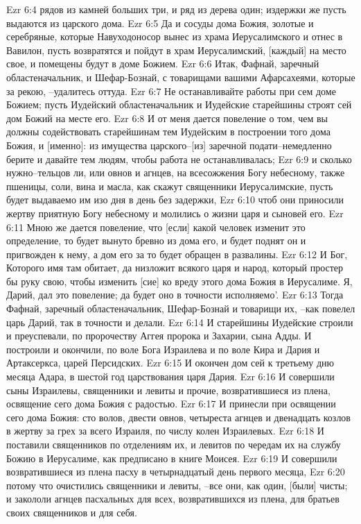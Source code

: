 Ezr 6:4  рядов из камней больших три, и ряд из дерева один; издержки же пусть выдаются из царского дома.
Ezr 6:5  Да и сосуды дома Божия, золотые и серебряные, которые Навуходоносор вынес из храма Иерусалимского и отнес в Вавилон, пусть возвратятся и пойдут в храм Иерусалимский, [каждый] на место свое, и помещены будут в доме Божием.
Ezr 6:6  Итак, Фафнай, заречный областеначальник, и Шефар-Бознай, с товарищами вашими Афарсахеями, которые за рекою, --удалитесь оттуда.
Ezr 6:7  Не останавливайте работы при сем доме Божием; пусть Иудейский областеначальник и Иудейские старейшины строят сей дом Божий на месте его.
Ezr 6:8  И от меня дается повеление о том, чем вы должны содействовать старейшинам тем Иудейским в построении того дома Божия, и [именно]: из имущества царского--[из] заречной подати--немедленно берите и давайте тем людям, чтобы работа не останавливалась;
Ezr 6:9  и сколько нужно--тельцов ли, или овнов и агнцев, на всесожжения Богу небесному, также пшеницы, соли, вина и масла, как скажут священники Иерусалимские, пусть будет выдаваемо им изо дня в день без задержки,
Ezr 6:10  чтоб они приносили жертву приятную Богу небесному и молились о жизни царя и сыновей его.
Ezr 6:11  Мною же дается повеление, что [если] какой человек изменит это определение, то будет вынуто бревно из дома его, и будет поднят он и пригвожден к нему, а дом его за то будет обращен в развалины.
Ezr 6:12  И Бог, Которого имя там обитает, да низложит всякого царя и народ, который простер бы руку свою, чтобы изменить [сие] ко вреду этого дома Божия в Иерусалиме. Я, Дарий, дал это повеление; да будет оно в точности исполняемо'.
Ezr 6:13  Тогда Фафнай, заречный областеначальник, Шефар-Бознай и товарищи их, --как повелел царь Дарий, так в точности и делали.
Ezr 6:14  И старейшины Иудейские строили и преуспевали, по пророчеству Аггея пророка и Захарии, сына Адды. И построили и окончили, по воле Бога Израилева и по воле Кира и Дария и Артаксеркса, царей Персидских.
Ezr 6:15  И окончен дом сей к третьему дню месяца Адара, в шестой год царствования царя Дария.
Ezr 6:16  И совершили сыны Израилевы, священники и левиты и прочие, возвратившиеся из плена, освящение сего дома Божия с радостью.
Ezr 6:17  И принесли при освящении сего дома Божия: сто волов, двести овнов, четыреста агнцев и двенадцать козлов в жертву за грех за всего Израиля, по числу колен Израилевых.
Ezr 6:18  И поставили священников по отделениям их, и левитов по чередам их на службу Божию в Иерусалиме, как предписано в книге Моисея.
Ezr 6:19  И совершили возвратившиеся из плена пасху в четырнадцатый день первого месяца,
Ezr 6:20  потому что очистились священники и левиты, --все они, как один, [были] чисты; и закололи агнцев пасхальных для всех, возвратившихся из плена, для братьев своих священников и для себя.

